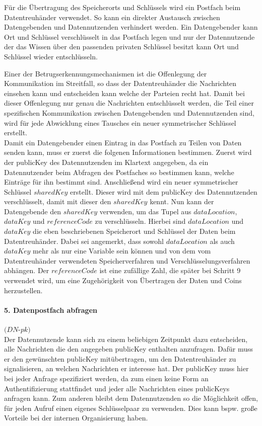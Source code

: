\documentclass[11pt,a4paper]{scrreprt}
\begin{document}
Für die Übertragung des Speicherorts und Schlüssels wird ein Postfach beim Datentreuhänder verwendet. So kann ein direkter Austausch zwischen Datengebenden und Datennutzenden verhindert werden. Ein Datengebender kann Ort und Schlüssel verschlüsselt in das Postfach legen und nur der Datennutzende der das Wissen über den passenden privaten Schlüssel besitzt kann Ort und Schlüssel wieder entschlüsseln.

Einer der Betrugserkennungsmechanismen ist die Offenlegung der Kommunikation im Streitfall, so dass der Datentreuhänder die Nachrichten einsehen kann und entscheiden kann welche der Parteien recht hat. Damit bei dieser Offenlegung nur genau die Nachrichten entschlüsselt werden, die Teil einer spezifischen Kommunikation zwischen Datengebenden und Datennutzenden sind, wird für jede Abwicklung eines Tausches ein neuer symmetrischer Schlüssel erstellt.\\

Damit ein Datengebender einen Eintrag in das Postfach zu Teilen von Daten senden kann, muss er zuerst die folgenen Informationen bestimmen. Zuerst wird der publicKey des Datennutzenden im Klartext angegeben, da ein Datennutzender beim Abfragen des Postfaches so bestimmen kann, welche Einträge für ihn bestimmt sind. Anschließend wird ein neuer symmetrischer Schlüssel $sharedKey$ erstellt. Dieser wird mit dem publicKey des Datennutzenden verschlüsselt, damit mit dieser den $sharedKey$ kennt. Nun kann der Datengebende den $sharedKey$ verwenden, um das Tupel aus $dataLocation$, $dataKey$ und $referenceCode$ zu verschlüsseln. Hierbei sind $dataLocation$ und $dataKey$ die eben beschriebenen Speicherort und Schlüssel der Daten beim Datentreuhänder. Dabei sei angemerkt, dass sowohl $dataLocation$ als auch $dataKey$ mehr als nur eine Variable sein können und von dem vom Datentreuhänder verwendeten Speicherverfahren und Verschlüsselungsverfahren abhängen. Der $referenceCode$ ist eine zufällige Zahl, die später bei Schritt 9 verwendet wird, um eine Zugehörigkeit von Übertragen der Daten und Coins herzustellen.

\paragraph{5. Datenpostfach abfragen} $(DN$-$pk)$\\
Der Datennutzende kann sich zu einem beliebigen Zeitpunkt dazu entscheiden, alle Nachrichten die den angegeben publicKey enthalten anzufragen. Dafür muss er den gewünschten publicKey mitübertragen, um den Datentreuhänder zu signalisieren, an welchen Nachrichten er interesse hat. Der publicKey muss hier bei jeder Anfrage spezifiziert werden, da zum einen keine Form an Authentifizierung stattfindet und jeder alle Nachrichten eines publicKeys anfragen kann. Zum anderen bleibt dem Datennutzenden so die Möglichkeit offen, für jeden Aufruf einen eigenes Schlüsselpaar zu verwenden. Dies kann bspw. große Vorteile bei der internen Organisierung haben.
\end{document}
